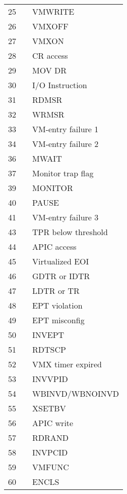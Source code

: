 \documentclass{report}
\begin{document}
\begin{spacing}{1.5}
\begin{longtable}{lcl}
\large{25}  & &   \large{VMWRITE} \\
\large{26}  & &   \large{VMXOFF} \\
\large{27}  & &   \large{VMXON} \\
\large{28}  & &   \large{CR access} \\
\large{29}  & &   \large{MOV DR} \\
\large{30}  & &   \large{I/O Instruction} \\
\large{31}  & &   \large{RDMSR} \\
\large{32}  & &   \large{WRMSR} \\
\large{33}  & &   \large{VM-entry failure 1} \\
\large{34}  & &   \large{VM-entry failure 2} \\
\large{36}  & &   \large{MWAIT} \\
\large{37}  & &   \large{Monitor trap flag} \\
\large{39}  & &   \large{MONITOR} \\
\large{40}  & &   \large{PAUSE} \\
\large{41}  & &   \large{VM-entry failure 3} \\
\large{43}  & &   \large{TPR below threshold} \\
\large{44}  & &   \large{APIC access} \\
\large{45}  & &   \large{Virtualized EOI} \\
\large{46}  & &   \large{GDTR or IDTR} \\
\large{47}  & &   \large{LDTR or TR} \\
\large{48}  & &   \large{EPT violation} \\
\large{49}  & &   \large{EPT misconfig} \\
\large{50}  & &   \large{INVEPT} \\
\large{51}  & &   \large{RDTSCP} \\
\large{52}  & &   \large{VMX timer expired} \\
\large{53}  & &   \large{INVVPID} \\
\large{54}  & &   \large{WBINVD/WBNOINVD} \\
\large{55}  & &   \large{XSETBV} \\
\large{56}  & &   \large{APIC write} \\
\large{57}  & &   \large{RDRAND} \\
\large{58}  & &   \large{INVPCID} \\
\large{59}  & &   \large{VMFUNC} \\
\large{60}  & &   \large{ENCLS} \\

\end{longtable}
\end{spacing}
\end{document}
